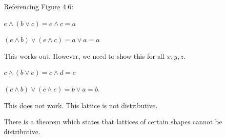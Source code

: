 \documentclass[twoside]{article}
\begin{document}
Referencing Figure 4.6:

$e \wedge (b \vee c) = e \wedge c = a$

$(e \wedge b) \vee (e \wedge c) = a \vee a = a$

\vspace{.2cm}
This works out. However, we need to show this for all $x,y,z$.

\vspace{.2cm}
$c \wedge (b \vee e) = c \wedge d = c$

$(c \wedge b) \vee (c \wedge e) = b \vee a = b$.

\vspace{.2cm}
This does not work. This lattice is not distributive.
\vspace{.2cm}

There is a theorem which states that lattices of certain shapes cannot be distributive.
\end{document}
